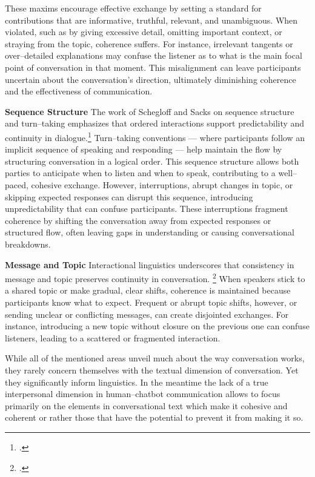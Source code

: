 \documentclass[12pt]{report}
\begin{document}
{These maxims encourage effective exchange by setting a standard for contributions that are informative, truthful, relevant, and unambiguous. When violated, such as by giving excessive detail, omitting important context, or straying from the topic, coherence suffers. For instance, irrelevant tangents or over–detailed explanations may confuse the listener as to what is the main focal point of conversation in that moment. This misalignment can leave participants uncertain about the conversation’s direction, ultimately diminishing coherence and the effectiveness of communication.

\par{\textbf{Sequence Structure}}
The work of Schegloff and Sacks on sequence structure and turn–taking emphasizes that ordered interactions support predictability and continuity in dialogue.\footcite{Schegloff_2007}
Turn–taking conventions — where participants follow an implicit sequence of speaking and responding — help maintain the flow by structuring conversation in a logical order. This sequence structure allows both parties to anticipate when to listen and when to speak, contributing to a well–paced, cohesive exchange. However, interruptions, abrupt changes in topic, or skipping expected responses can disrupt this sequence, introducing unpredictability that can confuse participants. These interruptions fragment coherence by shifting the conversation away from expected responses or structured flow, often leaving gaps in understanding or causing conversational breakdowns.

\par{\textbf{Message and Topic}}
Interactional linguistics underscores that consistency in message and topic preserves continuity in conversation.
\footcite{CouperKuhlenSelting2017}
When speakers stick to a shared topic or make gradual, clear shifts, coherence is
maintained because participants know what to expect.
Frequent or abrupt topic shifts, however, or sending unclear or conflicting messages, can create disjointed exchanges.
For instance, introducing a new topic without closure on the previous one can confuse listeners,
leading to a scattered or fragmented interaction.

\par
While all of the mentioned areas unveil much about the way conversation works,
they rarely concern themselves with the textual dimension of conversation.
Yet they significantly inform linguistics.
In the meantime
the lack of a true interpersonal dimension in human–chatbot communication
allows to focus primarily on the elements in conversational text
which make it cohesive and coherent or rather
those that have the potential to prevent it from making it so.

}
\end{document}

